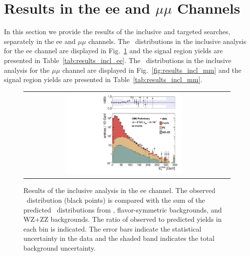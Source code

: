 \clearpage

\section{Results in the ee and $\mu\mu$ Channels}
\label{app:results}

In this section we provide the results of the inclusive and targeted searches, separately in the ee and $\mu\mu$ channels.
The \MET\ distributions in the inclusive analysis for the ee channel are displayed in Fig.~\ref{fig:results_incl_ee} and 
the signal region yields are presented in Table~\ref{tab:results_incl_ee}.
The \MET\ distributions in the inclusive analysis for the $\mu\mu$ channel are displayed in Fig.~\ref{fig:results_incl_mm} and 
the signal region yields are presented in Table~\ref{tab:results_incl_mm}.

\begin{figure}[!h]
\begin{center}
\begin{tabular}{cc}
\includegraphics[width=0.6\textwidth]{plots/met_1.pdf}
\end{tabular}
\caption{Results of the inclusive analysis in the ee channel. The observed \MET\ distribution (black points) is compared with the sum of the predicted \MET\
distributions from \zjets, flavor-symmetric backgrounds, and WZ+ZZ backgrounds. The ratio of observed to predicted yields in each bin is
indicated. The error bars indicate the statistical uncertainty in the data and the shaded band indicates the total background uncertainty.
\label{fig:results_incl_ee}
}
\end{center}
\end{figure}

